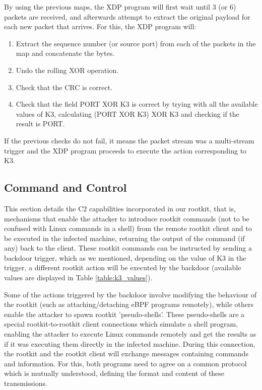 By using the previous maps, the XDP program will first wait until 3 (or 6) packets are received, and afterwards attempt to extract the original payload for each new packet that arrives. For this, the XDP program will:
\begin{enumerate}
\item Extract the sequence number (or source port) from each of the packets in the map and concatenate the bytes.
\item Undo the rolling XOR operation.
\item Check that the CRC is correct.
\item Check that the field PORT XOR K3 is correct by trying with all the available values of K3, calculating (PORT XOR K3) XOR K3 and checking if the result is PORT.
\end{enumerate}

If the previous checks do not fail, it means the packet stream was a multi-stream trigger and the XDP program proceeds to execute the action corresponding to K3.



\subsection{Command and Control} \label{subsection:c2}
This section details the C2 capabilities incorporated in our rootkit, that is, mechanisms that enable the attacker to introduce rootkit commands (not to be confused with Linux commands in a shell) from the remote rootkit client and to be executed in the infected machine, returning the output of the command (if any) back to the client. These rootkit commands can be instructed by sending a backdoor trigger, which as we mentioned, depending on the value of K3 in the trigger, a different rootkit action will be executed by the backdoor (available values are displayed in Table \ref{table:k3_values}).

Some of the actions triggered by the backdoor involve modifying the behaviour of the rootkit (such as attaching/detaching eBPF programs remotely), while others enable the attacker to spawn rootkit 'pseudo-shells'. These pseudo-shells are a special rootkit-to-rootkit client connections which simulate a shell program, enabling the attacker to execute Linux commands remotely and get the results as if it was executing them directly in the infected machine. During this connection, the rootkit and the rootkit client will exchange messages containing commands and information. For this, both programs need to agree on a common protocol which is mutually understood, defining the format and content of these transmissions.

